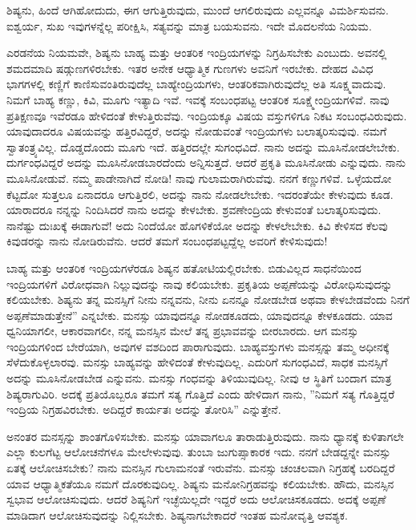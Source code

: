 ಶಿಷ್ಯನು, ಹಿಂದೆ ಆಗಿಹೋದುದು, ಈಗ ಆಗುತ್ತಿರುವುದು, ಮುಂದೆ ಆಗಲಿರುವುದು ಎಲ್ಲವನ್ನೂ ವಿಮರ್ಶಿಸುವನು. ಐಶ್ವರ್ಯ, ಸುಖ ಇವುಗಳನ್ನೆಲ್ಲ ಪರೀಕ್ಷಿಸಿ, ಸತ್ಯವನ್ನು ಮಾತ್ರ ಬಯಸುವನು. ಇದೇ ಮೊದಲನೆಯ ನಿಯಮ.

ಎರಡನೆಯ ನಿಯಮವೇ, ಶಿಷ್ಯನು ಬಾಹ್ಯ ಮತ್ತು ಆಂತರಿಕ ಇಂದ್ರಿಯಗಳನ್ನು ನಿಗ್ರಹಿಸಬೇಕು ಎಂಬುದು. ಅವನಲ್ಲಿ ಶಮದಮಾದಿ ಷಡ್ಗುಣಗಳಿರಬೇಕು. ಇತರ ಅನೇಕ ಆಧ್ಯಾತ್ಮಿಕ ಗುಣಗಳು ಅವನಿಗೆ ಇರಬೇಕು. ದೇಹದ ವಿವಿಧ ಭಾಗಗಳಲ್ಲಿ ಕಣ್ಣಿಗೆ ಕಾಣಿಸುವಂತಿರುವುದೆಲ್ಲ ಬಾಹ್ಯೇಂದ್ರಿಯಗಳು, ಆಂತರಿಕವಾಗಿರುವುದೆಲ್ಲ ಅತಿ ಸೂಕ್ಷ್ಮವಾದುವು. ನಿಮಗೆ ಬಾಹ್ಯ ಕಣ್ಣು, ಕಿವಿ, ಮೂಗು ಇತ್ಯಾದಿ ಇವೆ. ಇವಕ್ಕೆ ಸಂಬಂಧಪಟ್ಟ ಆಂತರಿಕ ಸೂಕ್ಷ್ಮೇಂದ್ರಿಯಗಳಿವೆ. ನಾವು ಪ್ರತಿಕ್ಷಣವೂ ಇವೆರಡೂ ಹೇಳಿದಂತೆ ಕೇಳುತ್ತಿರುವೆವು. ಇಂದ್ರಿಯಕ್ಕೂ ವಿಷಯ ವಸ್ತುಗಳಿಗೂ ನಿಕಟ ಸಂಬಂಧವಿರುವುದು. ಯಾವುದಾದರೂ ವಿಷಯವನ್ನು ಹತ್ತಿರವಿದ್ದರೆ, ಅದನ್ನು ನೋಡುವಂತೆ ಇಂದ್ರಿಯಗಳು ಬಲಾತ್ಕರಿಸುವುವು. ನಮಗೆ ಸ್ವಾತಂತ್ರ್ಯವಿಲ್ಲ. ದೊಡ್ಡದೊಂದು ಮೂಗು ಇದೆ. ಹತ್ತಿರದಲ್ಲೇ ಸುಗಂಧವಿದೆ. ನಾನು ಅದನ್ನು ಮೂಸಿನೋಡಲೇಬೇಕು. ದುರ್ಗಂಧವಿದ್ದರೆ ಅದನ್ನು ಮೂಸಿನೋಡಬಾರದೆಂದು ಅನ್ನಿಸುತ್ತದೆ. ಆದರೆ ಪ್ರಕೃತಿ ಮೂಸಿನೋಡು ಎನ್ನುವುದು. ನಾನು ಮೂಸಿನೋಡುವೆ. ನಮ್ಮ ಪಾಡೇನಾಗಿದೆ ನೋಡಿ! ನಾವು ಗುಲಾಮರಾಗಿರುವೆವು. ನನಗೆ ಕಣ್ಣುಗಳಿವೆ. ಒಳ್ಳೆಯದೋ ಕೆಟ್ಟದೋ ಸುತ್ತಲೂ ಏನಾದರೂ ಆಗುತ್ತಿರಲಿ, ಅದನ್ನು ನಾನು ನೋಡಲೇಬೇಕು. ಇದರಂತೆಯೇ ಕೇಳುವುದು ಕೂಡ. ಯಾರಾದರೂ ನನ್ನನ್ನು ನಿಂದಿಸಿದರೆ ನಾನು ಅದನ್ನು ಕೇಳಬೇಕು. ಶ್ರವಣೇಂದ್ರಿಯ ಕೇಳುವಂತೆ ಬಲಾತ್ಕರಿಸುವುದು. ನಾನೆಷ್ಟು ದುಃಖಕ್ಕೆ ಈಡಾಗುವೆ! ಅದು ನಿಂದೆಯೋ ಹೊಗಳಿಕೆಯೋ ಅದನ್ನು ಕೇಳಲೇಬೇಕು. ಕಿವಿ ಕೇಳಿಸದ ಕೆಲವು ಕಿವುಡರನ್ನು ನಾನು ನೋಡಿರುವೆನು. ಆದರೆ ತಮಗೆ ಸಂಬಂಧಪಟ್ಟದ್ದೆಲ್ಲ ಅವರಿಗೆ ಕೇಳಿಸುವುದು!

ಬಾಹ್ಯ ಮತ್ತು ಆಂತರಿಕ ಇಂದ್ರಿಯಗಳೆರಡೂ ಶಿಷ್ಯನ ಹತೋಟಿಯಲ್ಲಿರಬೇಕು. ಬಿಡುವಿಲ್ಲದ ಸಾಧನೆಯಿಂದ ಇಂದ್ರಿಯಗಳಿಗೆ ವಿರೋಧವಾಗಿ ನಿಲ್ಲುವುದನ್ನು ನಾವು ಕಲಿಯಬೇಕು. ಪ್ರಕೃತಿಯ ಅಪ್ಪಣೆಯನ್ನು ವಿರೋಧಿಸುವುದನ್ನು ಕಲಿಯಬೇಕು. ಶಿಷ್ಯನು ತನ್ನ ಮನಸ್ಸಿಗೆ ನೀನು ನನ್ನವನು, ನೀನು ಏನನ್ನೂ ನೋಡಬೇಡ ಅಥವಾ ಕೇಳಬೇಡವೆಂದು ನಿನಗೆ ಅಪ್ಪಣೆಮಾಡುತ್ತೇನೆ'' ಎನ್ನಬೇಕು. ಮನಸ್ಸು ಯಾವುದನ್ನೂ ನೋಡಕೂಡದು, ಯಾವುದನ್ನೂ ಕೇಳಕೂಡದು. ಯಾವ ಧ್ವನಿಯಾಗಲೀ, ಆಕಾರವಾಗಲೀ, ನನ್ನ ಮನಸ್ಸಿನ ಮೇಲೆ ತನ್ನ ಪ್ರಭಾವವನ್ನು ಬೀರಬಾರದು. ಆಗ ಮನಸ್ಸು ಇಂದ್ರಿಯಗಳಿಂದ ಬೇರೆಯಾಗಿ, ಅವುಗಳ ವಶದಿಂದ ಪಾರಾಗುವುದು. ಬಾಹ್ಯವಸ್ತುಗಳು ಮನಸ್ಸನ್ನು ತಮ್ಮ ಅಧೀನಕ್ಕೆ ಸೆಳೆದುಕೊಳ್ಳಲಾರವು. ಮನಸ್ಸು ಬಾಹ್ಯವನ್ನು ಹೇಳಿದಂತೆ ಕೇಳುವುದಿಲ್ಲ. ಎದುರಿಗೆ ಸುಗಂಧವಿದೆ, ಸಾಧಕ ಮನಸ್ಸಿಗೆ ಅದನ್ನು ಮೂಸಿನೋಡಬೇಡ ಎನ್ನುವನು. ಮನಸ್ಸು ಗಂಧವನ್ನು ತಿಳಿಯುವುದಿಲ್ಲ. ನೀವು ಆ ಸ್ಥಿತಿಗೆ ಬಂದಾಗ ಮಾತ್ರ ಶಿಷ್ಯರಾಗುವಿರಿ. ಅದಕ್ಕೆ ಪ್ರತಿಯೊಬ್ಬರೂ ತಮಗೆ ಸತ್ಯ ಗೊತ್ತಿದೆ ಎಂದು ಹೇಳಿದಾಗ ನಾನು, ''ನಿಮಗೆ ಸತ್ಯ ಗೊತ್ತಿದ್ದರೆ ಇಂದ್ರಿಯ ನಿಗ್ರಹವಿರಬೇಕು. ಅದಿದ್ದರೆ ಕಾರ್ಯತಃ ಅದನ್ನು ತೋರಿಸಿ” ಎನ್ನುತ್ತೇನೆ.

ಅನಂತರ ಮನಸ್ಸನ್ನು ಶಾಂತಗೊಳಿಸಬೇಕು. ಮನಸ್ಸು ಯಾವಾಗಲೂ ತಾರಾಡುತ್ತಿರುವುದು. ನಾನು ಧ್ಯಾನಕ್ಕೆ ಕುಳಿತಾಗಲೇ ಎಲ್ಲಾ ಕುಲಗೆಟ್ಟ ಆಲೋಚನೆಗಳೂ ಮೇಲೇಳುವುವು. ತುಂಬಾ ಜುಗುಪ್ಸಾಕಾರಕ ಇದು. ನನಗೆ ಬೇಡದ್ದನ್ನೇ ಮನಸ್ಸು ಏತಕ್ಕೆ ಆಲೋಚಿಸಬೇಕು? ನಾನು ಮನಸ್ಸಿನ ಗುಲಾಮನಂತೆ ಇರುವೆನು. ಮನಸ್ಸು ಚಂಚಲವಾಗಿ ನಿಗ್ರಹಕ್ಕೆ ಬರದಿದ್ದರೆ ಯಾವ ಆಧ್ಯಾತ್ಮಿಕತೆಯೂ ನಮಗೆ ದೊರಕುವುದಿಲ್ಲ. ಶಿಷ್ಯನು ಮನೋನಿಗ್ರಹವನ್ನು ಕಲಿಯಬೇಕು. ಹೌದು, ಮನಸ್ಸಿನ ಸ್ವಭಾವ ಆಲೋಚಿಸುವುದು. ಆದರೆ ಶಿಷ್ಯನಿಗೆ ಇಚ್ಛೆಯಿಲ್ಲದೇ ಇದ್ದರೆ ಅದು ಆಲೋಚಿಸಕೂಡದು. ಅದಕ್ಕೆ ಅಪ್ಪಣೆ ಮಾಡಿದಾಗ ಆಲೋಚಿಸುವುದನ್ನು ನಿಲ್ಲಿಸಬೇಕು. ಶಿಷ್ಯನಾಗಬೇಕಾದರೆ ಇಂತಹ ಮನೋವೃತ್ತಿ ಆವಶ್ಯಕ.

